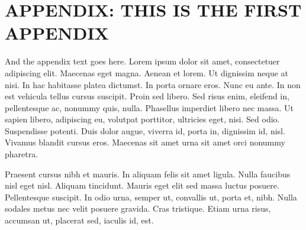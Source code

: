 


\appendix %

\chapter*{APPENDIX: THIS IS THE FIRST APPENDIX} %


\setcounter{chapter}{1} %

And the appendix text goes here. Lorem ipsum dolor sit amet, consectetuer
adipiscing elit. Maecenas eget magna. Aenean et lorem. Ut dignissim neque
at nisi. In hac habitasse platea dictumst. In porta ornare eros. Nunc eu ante.
In non est vehicula tellus cursus suscipit. Proin sed libero. Sed risus
enim, eleifend in, pellentesque ac, nonummy quis, nulla. Phasellus
imperdiet libero nec massa. Ut sapien libero, adipiscing eu,
volutpat porttitor, ultricies eget, nisi. Sed odio. Suspendisse
potenti. Duis dolor augue, viverra id, porta in, dignissim id, nisl.
Vivamus blandit cursus eros. Maecenas sit amet urna sit amet orci
nonummy pharetra.

Praesent cursus nibh et mauris. In aliquam felis sit amet ligula.
Nulla faucibus nisl eget nisl. Aliquam tincidunt. Mauris eget elit
sed massa luctus posuere. Pellentesque suscipit. In odio urna,
semper ut, convallis ut, porta et, nibh. Nulla sodales metus nec
velit posuere gravida. Cras tristique. Etiam urna risus, accumsan
ut, placerat sed, iaculis id, est.


